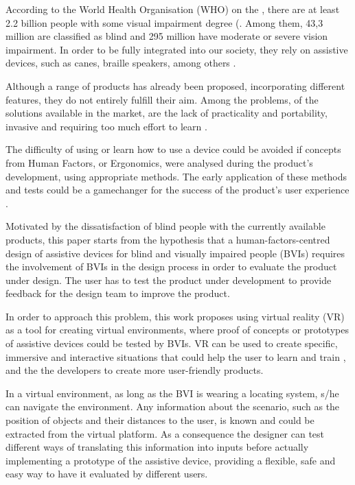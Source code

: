 

According to the World Health Organisation (WHO) on the , there are at least 2.2 billion people with some visual impairment degree (\cite{world2019world}. Among them, 43,3 million are classified as blind and 295 million have moderate or severe vision impairment. In order to be fully integrated into our society, they rely on assistive devices, such as canes, braille speakers, among others \cite{bourne2021trends}. 

Although a range of products has already been proposed, incorporating different features, they do not entirely fulfill their aim. Among the problems, of the solutions available in the market, are the lack of practicality and portability, invasive and requiring too much effort to learn \cite{lozano2009electrotactile}.

The difficulty of using or learn how to use a device could be avoided if concepts from Human Factors, or Ergonomics, were analysed during the product’s development, using appropriate methods. The early application of these methods and tests could be a gamechanger for the success of the product's user experience \cite{wolf2019towards}.

Motivated by the dissatisfaction of blind people with the currently available products, this paper starts from the hypothesis that a human-factors-centred design of assistive devices for blind and visually impaired people (BVIs) requires the involvement of BVIs in the design process in order to evaluate the product under design. The user has to test the product under development to provide feedback for the design team to improve the product.

In order to approach this problem, this work proposes using virtual reality (VR) as a tool for creating virtual environments, where proof of concepts or prototypes of assistive devices could be tested by BVIs. VR can be used to create specific, immersive and interactive situations that could help the user to learn and train \cite{farrell2018learning}, and the the developers to create more user-friendly products.

In a virtual environment, as long as the BVI is wearing a locating system, s/he can navigate the environment. Any information about the scenario, such as the position of objects and their distances to the user, is known and could be extracted from the virtual platform. As a consequence the designer can test different ways of translating this information into inputs before actually implementing a prototype of the assistive device, providing a flexible, safe and easy way to have it evaluated by different users.

